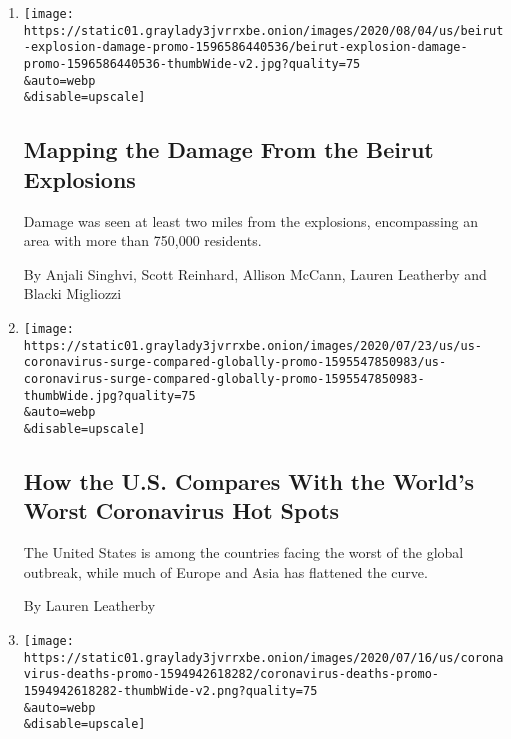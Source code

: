 \begin{enumerate}
\def\labelenumi{\arabic{enumi}.}
\item
  \href{/interactive/2020/08/04/world/middleeast/beirut-explosion-damage.html}{}

  \texttt{[image: https://static01.graylady3jvrrxbe.onion/images/2020/08/04/us/beirut-explosion-damage-promo-1596586440536/beirut-explosion-damage-promo-1596586440536-thumbWide-v2.jpg?quality=75\\\&auto=webp\\\&disable=upscale]}

  \hypertarget{mapping-the-damage-from-the-beirut-explosions}{%
  \subsection{Mapping the Damage From the Beirut
  Explosions}\label{mapping-the-damage-from-the-beirut-explosions}}

  Damage was seen at least two miles from the explosions, encompassing
  an area with more than 750,000 residents.

  By Anjali Singhvi, Scott Reinhard, Allison McCann, Lauren Leatherby
  and Blacki Migliozzi
\item
  \href{/interactive/2020/07/23/us/coronavirus-hotspots-countries.html}{}

  \texttt{[image: https://static01.graylady3jvrrxbe.onion/images/2020/07/23/us/us-coronavirus-surge-compared-globally-promo-1595547850983/us-coronavirus-surge-compared-globally-promo-1595547850983-thumbWide.jpg?quality=75\\\&auto=webp\\\&disable=upscale]}

  \hypertarget{how-the-us-compares-with-the-worlds-worst-coronavirus-hot-spots}{%
  \subsection{How the U.S. Compares With the World's Worst Coronavirus
  Hot
  Spots}\label{how-the-us-compares-with-the-worlds-worst-coronavirus-hot-spots}}

  The United States is among the countries facing the worst of the
  global outbreak, while much of Europe and Asia has flattened the
  curve.

  By Lauren Leatherby
\item
  \href{/interactive/2020/07/17/us/coronavirus-deaths.html}{}

  \texttt{[image: https://static01.graylady3jvrrxbe.onion/images/2020/07/16/us/coronavirus-deaths-promo-1594942618282/coronavirus-deaths-promo-1594942618282-thumbWide-v2.png?quality=75\\\&auto=webp\\\&disable=upscale]}


\end{enumerate}
